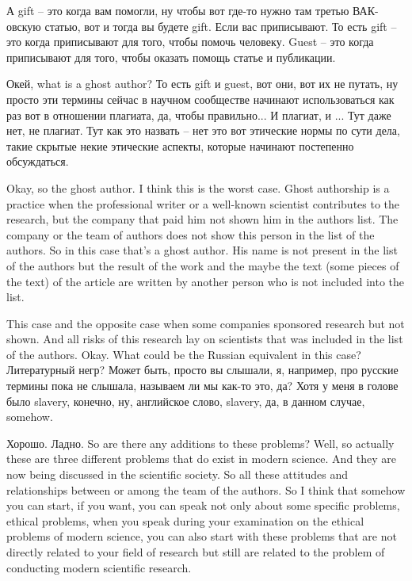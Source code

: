 \documentclass[main.tex]{subfiles}
\begin{document}
А gift -- это когда вам помогли, ну чтобы вот где-то нужно там третью ВАК-овскую статью, вот и тогда вы будете gift.
Если вас приписывают.
То есть gift -- это когда приписывают для того, чтобы помочь человеку.
Guest -- это когда приписывают для того, чтобы оказать помощь статье и публикации.

Окей, what is a ghost author?
То есть gift и guest, вот они, вот их не путать, ну просто эти термины сейчас в научном сообществе начинают использоваться как раз вот в отношении плагиата, да, чтобы правильно...
И плагиат, и ...
Тут даже нет, не плагиат.
Тут как это назвать -- нет это вот этические нормы по сути дела, такие скрытые некие этические аспекты, которые начинают постепенно обсуждаться.

Okay, so the ghost author.
I think this is the worst case.
Ghost authorship is a practice when the professional writer or a well-known scientist contributes to the research, but the company that paid him not shown him in the authors list.
The company or the team of authors does not show this person in the list of the authors.
So in this case that's a ghost author.
His name is not present in the list of the authors but the result of the work and the maybe the text (some pieces of the text) of the article are written by another person who is not included into the list.

This case and the opposite case when some companies sponsored research but not shown.
And all risks of this research lay on scientists that was included in the list of the authors.
Okay.
What could be the Russian equivalent in this case?
Литературный негр?
Может быть, просто вы слышали, я, например, про русские термины пока не слышала, называем ли мы как-то это, да?
Хотя у меня в голове было slavery, конечно, ну, английское слово, slavery, да, в данном случае, somehow.

Хорошо.
Ладно.
So are there any additions to these problems?
Well, so actually these are three different problems that do exist in modern science.
And they are now being discussed in the scientific society.
So all these attitudes and relationships between or among the team of the authors.
So I think that somehow you can start, if you want, you can speak not only about some specific problems, ethical problems, when you speak during your examination on the ethical problems of modern science, you can also start with these problems that are not directly related to your field of research but still are related to the problem of conducting modern scientific research.
\end{document}

